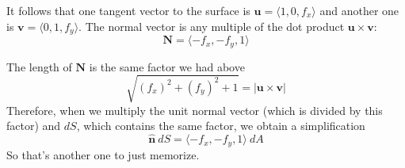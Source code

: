 \documentclass[11pt, oneside]{article}   	%
\begin{document}
It follows that one tangent vector to the surface is $\mathbf{u} = \langle 1, 0, f_x \rangle$ and another one is $\mathbf{v} = \langle 0, 1, f_y \rangle$.  The normal vector is any multiple of the dot product $\mathbf{u} \times \mathbf{v}$:
\[ \mathbf{N} =  \langle - f_x, - f_y, 1 \rangle \]

The length of $\mathbf{N}$ is the same factor we had above 
\[ \sqrt{(f_x)^2 + (f_y)^2 + 1} = | \mathbf{u} \times \mathbf{v} | \]
Therefore, when we multiply the unit normal vector (which is divided by this factor) and $dS$, which contains the same factor, we obtain a simplification
\[ \mathbf{\hat{n}} \ dS =  \langle - f_x, - f_y, 1 \rangle \ dA \]
So that's another one to just memorize.
\end{document}
